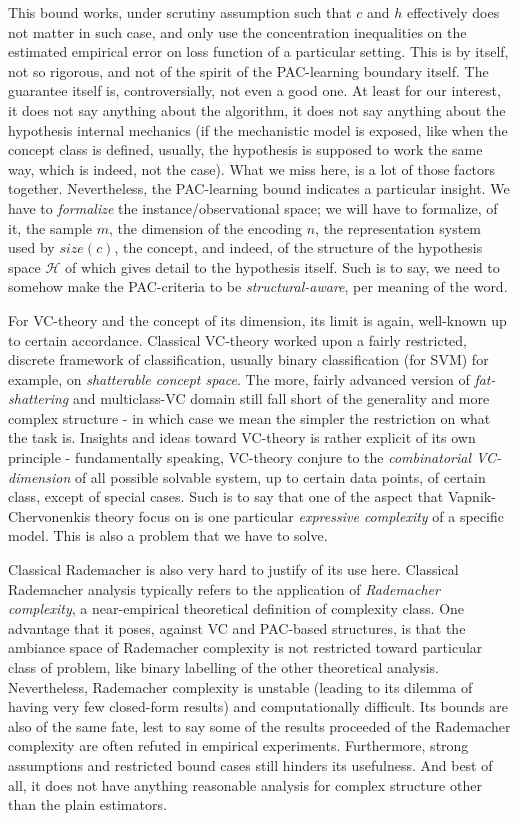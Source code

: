 \documentclass[10pt]{article}
\begin{document}
This bound works, under scrutiny assumption such that $c$ and $h$ effectively does not matter in such case, and only use the concentration inequalities on the estimated empirical error on loss function of a particular setting. This is by itself, not so rigorous, and not of the spirit of the PAC-learning boundary itself. The guarantee itself is, controversially, not even a good one. At least for our interest, it does not say anything about the algorithm, it does not say anything about the hypothesis internal mechanics (if the mechanistic model is exposed, like when the concept class is defined, usually, the hypothesis is supposed to work the same way, which is indeed, not the case). What we miss here, is a lot of those factors together. Nevertheless, the PAC-learning bound indicates a particular insight. We have to \textit{formalize} the instance/observational space; we will have to formalize, of it, the sample $m$, the dimension of the encoding $n$, the representation system used by $size(c)$, the concept, and indeed, of the structure of the hypothesis space $\mathcal{H}$ of which gives detail to the hypothesis itself. Such is to say, we need to somehow make the PAC-criteria to be \textit{structural-aware}, per meaning of the word. 

For VC-theory and the concept of its dimension, its limit is again, well-known up to certain accordance. Classical VC-theory worked upon a fairly restricted, discrete framework of classification, usually binary classification (for SVM) for example, on \textit{shatterable concept space}. The more, fairly advanced version of \textit{fat-shattering} and multiclass-VC domain still fall short of the generality and more complex structure - in which case we mean the simpler the restriction on what the task is. Insights and ideas toward VC-theory is rather explicit of its own principle - fundamentally speaking, VC-theory conjure to the \textit{combinatorial VC-dimension} of all possible solvable system, up to certain data points, of certain class, except of special cases. Such is to say that one of the aspect that Vapnik-Chervonenkis theory focus on is one particular \textit{expressive complexity} of a specific model. This is also a problem that we have to solve. 

Classical Rademacher is also very hard to justify of its use here. Classical Rademacher analysis typically refers to the application of \textit{Rademacher complexity}, a near-empirical theoretical definition of complexity class. One advantage that it poses, against VC and PAC-based structures, is that the ambiance space of Rademacher complexity is not restricted toward particular class of problem, like binary labelling of the other theoretical analysis. Nevertheless, Rademacher complexity is unstable (leading to its dilemma of having very few closed-form results) and computationally difficult. Its bounds are also of the same fate, lest to say some of the results proceeded of the Rademacher complexity are often refuted in empirical experiments. Furthermore, strong assumptions and restricted bound cases still hinders its usefulness. And best of all, it does not have anything reasonable analysis for complex structure other than the plain estimators. 
\end{document}
